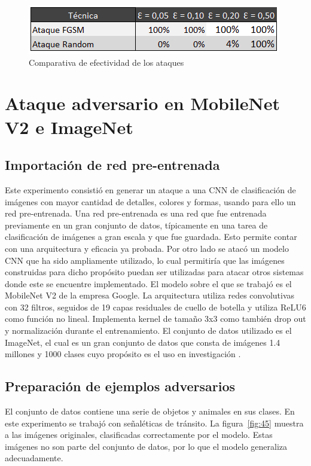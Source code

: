 \begin{figure}[!h]
\centering
\includegraphics[scale = 1]{Figures/figura_44.PNG}
\decoRule
\caption[Comparativa de efectividad de los ataques FGSM y aleatorio.]{Comparativa de efectividad de los ataques}
\label{fig:44}
\end{figure}




\section{Ataque adversario en MobileNet V2 e ImageNet}
\subsection{Importación de red pre-entrenada}
Este experimento consistió en generar un ataque a una CNN de clasificación de imágenes con mayor cantidad de detalles, colores y formas, usando para ello un red pre-entrenada. Una red pre-entrenada es una red que fue entrenada previamente en un gran conjunto de datos, típicamente en una tarea de clasificación de imágenes a gran escala y que fue guardada. Esto permite contar con una arquitectura y eficacia ya probada. Por otro lado se atacó un modelo CNN que ha sido ampliamente utilizado, lo cual permitiría que las imágenes construidas para dicho propósito puedan ser utilizadas para atacar otros sistemas donde este se encuentre implementado. El modelo sobre el que se trabajó es el MobileNet V2 \parencite{r58} de la empresa Google. La arquitectura utiliza redes convolutivas con 32 filtros, seguidos de 19 capas residuales de cuello de botella y utiliza ReLU6 como función no lineal. Implementa kernel de tamaño 3x3 como también drop out y normalización durante el entrenamiento. El conjunto de datos utilizado es el ImageNet, el cual es un gran conjunto de datos que consta de imágenes 1.4 millones y 1000 clases cuyo propósito es el uso en investigación \parencite{r59}. 

\subsection{Preparación de ejemplos adversarios}

El conjunto de datos contiene una serie de objetos y animales en sus clases. En este experimento se trabajó con señaléticas de tránsito. La figura~\ref{fig:45}  muestra a las imágenes originales, clasificadas correctamente por el modelo. Estas imágenes no son parte del conjunto de datos, por lo que el modelo generaliza adecuadamente.

